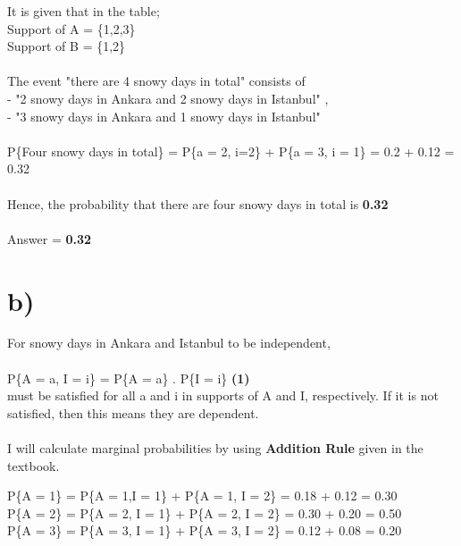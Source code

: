\documentclass[11pt]{article}
\begin{document}
\noindent It is given that in the table; \\
Support of A = \{1,2,3\} \\ 
Support of B = \{1,2\} \\ \\

\noindent The event "there are 4 snowy days in total" consists of \\ 
- "2 snowy days in Ankara and 2 snowy days in Istanbul" ,\\
- "3 snowy days in Ankara and 1 snowy days in Istanbul" \\ \\ 

\noindent P\{Four snowy days in total\} = P\{a = 2, i=2\} + P\{a = 3, i = 1\} = 0.2 + 0.12 = 0.32 \\ \\
\noindent Hence, the probability that there are four snowy days in total is \textbf{0.32} \\ \\
Answer = \textbf{0.32}

\section*{b)}
For snowy days in Ankara and Istanbul to be independent, \\ \\
P\{A = a, I = i\} =  P\{A = a\} . P\{I = i\} \space \space \textbf{(1)}\\ must be satisfied for all a and i in supports of A and I, respectively.  If it is not satisfied, then this means they are dependent. \\ \\
\noindent
I will calculate marginal probabilities by using \textbf{Addition Rule} given in the textbook.
\newline

\noindent P\{A = 1\} = P\{A = 1,I = 1\} + P\{A = 1, I = 2\} = 0.18 + 0.12 = 0.30 \\
P\{A = 2\} = P\{A = 2, I = 1\} + P\{A = 2, I = 2\} = 0.30 + 0.20 = 0.50 \\
P\{A = 3\} = P\{A = 3, I = 1\} + P\{A = 3, I = 2\} = 0.12 + 0.08 = 0.20 \\
\end{document}
